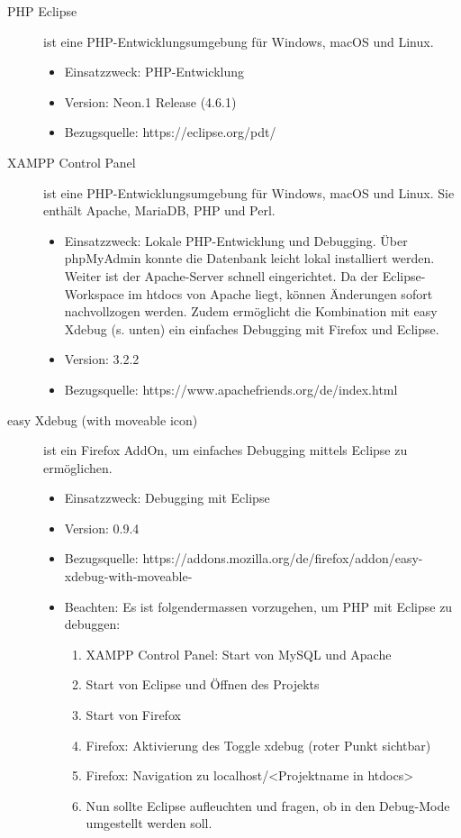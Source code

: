 \begin{description}
	\item [PHP Eclipse] ist eine PHP-Entwicklungsumgebung für Windows, macOS und Linux.
	\begin{itemize}
		\item Einsatzzweck: PHP-Entwicklung
		\item Version: Neon.1 Release (4.6.1)
		\item Bezugsquelle: https://eclipse.org/pdt/
	\end{itemize}	
	
	
	\item [XAMPP Control Panel] ist eine PHP-Entwicklungsumgebung für Windows, macOS und Linux. Sie enthält Apache, MariaDB, PHP und Perl.
	\begin{itemize}
		\item Einsatzzweck: Lokale PHP-Entwicklung und Debugging. Über phpMyAdmin konnte die Datenbank leicht lokal installiert werden. Weiter ist der Apache-Server schnell eingerichtet. Da der Eclipse-Workspace im htdocs von Apache liegt, können Änderungen sofort nachvollzogen werden. Zudem ermöglicht die Kombination mit easy Xdebug (s. unten) ein einfaches Debugging mit Firefox und Eclipse.
		\item Version: 3.2.2
		\item Bezugsquelle: https://www.apachefriends.org/de/index.html
	\end{itemize}
	
	
	\item [easy Xdebug (with moveable icon)] ist ein Firefox AddOn, um einfaches Debugging mittels Eclipse zu ermöglichen.
	\begin{itemize}
		\item Einsatzzweck: Debugging mit Eclipse
		\item Version: 0.9.4
		\item Bezugsquelle: https://addons.mozilla.org/de/firefox/addon/easy-xdebug-with-moveable-
		\item Beachten: Es ist folgendermassen vorzugehen, um PHP mit Eclipse zu debuggen:
		\begin{enumerate}
			\item XAMPP Control Panel: Start von MySQL und Apache
			\item Start von Eclipse und Öffnen des Projekts
			\item Start von Firefox
			\item Firefox: Aktivierung des Toggle xdebug (roter Punkt sichtbar)
			\item Firefox: Navigation zu localhost/\textless Projektname in htdocs\textgreater
			\item Nun sollte Eclipse aufleuchten und fragen, ob in den Debug-Mode umgestellt werden soll.
		\end{enumerate}
	\end{itemize}
	

\end{description}
